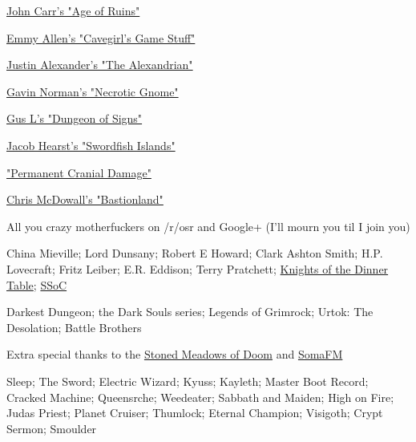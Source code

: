 \begin{multicols*}{2}
{  \item \href{https://ageofruins.wordpress.com}{John Carr's "Age of Ruins"}
  \item \href{https://cavegirlgames.blogspot.com/}{Emmy Allen's "Cavegirl's Game Stuff"}
  \item \href{https://thealexandrian.ne}{Justin Alexander's "The Alexandrian"}
  \item \href{https://necroticgnome.com/blogs/news}{Gavin Norman's "Necrotic Gnome"}
  \item \href{https://dungeonofsigns.blogspot.com/}{Gus L's "Dungeon of Signs"}
  \item \href{https://blog.swordfish.press/}{Jacob Hearst's "Swordfish Islands"}
  \item \href{https://permacrandam.blogspot.com/}{"Permanent Cranial Damage"}
  \item \href{https://www.bastionland.com/}{Chris McDowall's "Bastionland"}
  \item All you crazy motherfuckers on /r/osr and Google+ (I'll mourn you til I join you)
}



China Mieville; Lord Dunsany; Robert E Howard; Clark Ashton Smith; H.P. Lovecraft; Fritz Leiber; E.R. Eddison; Terry Pratchett; \href{https://kenzerco.com/knights-of-the-dinner-table/}{Knights of the Dinner Table}; \href{https://en.wikipedia.org/wiki/Savage_Sword_of_Conan}{SSoC}



Darkest Dungeon; the Dark Souls series; Legends of Grimrock; Urtok: The Desolation; Battle Brothers



Extra special thanks to the \href{https://www.youtube.com/channel/UCknVpWR6m2Ijzkqo-aPXs_g}{Stoned Meadows of Doom} and \href{https://soma.fm}{SomaFM}

Sleep; The Sword; Electric Wizard; Kyuss; Kayleth; Master Boot Record; Cracked Machine; Queensr{\UmlautY}che; Weedeater; Sabbath and Maiden; High on Fire; Judas Priest; Planet Cruiser; Thumlock; Eternal Champion; Visigoth; Crypt Sermon; Smoulder

\end{multicols*}
